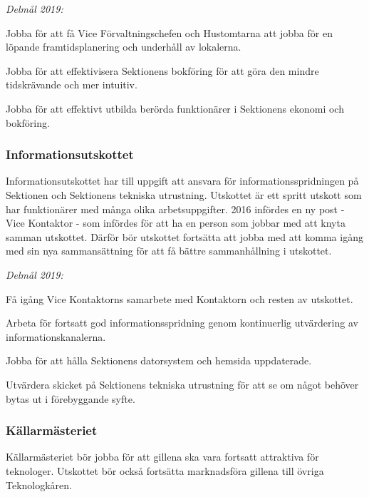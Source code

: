 \documentclass[10pt]{article}
\begin{document}
    \emph{Delmål 2019:}
    \begin{dashlist}
        \item Jobba för att få Vice Förvaltningschefen och Hustomtarna att jobba för en löpande framtidsplanering och underhåll av lokalerna. 
        \item Jobba för att effektivisera Sektionens bokföring för att göra den mindre tidskrävande och mer intuitiv. 
        \item Jobba för att effektivt utbilda berörda funktionärer i Sektionens ekonomi och bokföring.
    \end{dashlist}
    
    \newpage
    
    \subsubsection*{Informationsutskottet}
    Informationsutskottet har till uppgift att ansvara för informationsspridningen på Sektionen och Sektionens tekniska utrustning. Utskottet är ett spritt utskott som har funktionärer med många olika arbetsuppgifter. 2016 infördes en ny post - Vice Kontaktor - som infördes för att ha en person som jobbar med att knyta samman utskottet. Därför bör utskottet fortsätta att jobba med att komma igång med sin nya sammansättning för att få bättre sammanhållning i utskottet.
    
    \emph{Delmål 2019:}
    \begin{dashlist}
        \item Få igång Vice Kontaktorns samarbete med Kontaktorn och resten av utskottet.
        \item Arbeta för fortsatt god informationsspridning genom kontinuerlig utvärdering av informationskanalerna.
        \item Jobba för att hålla Sektionens datorsystem och hemsida uppdaterade.
        \item Utvärdera skicket på Sektionens tekniska utrustning för att se om något behöver bytas ut i förebyggande syfte.
    \end{dashlist}
    
    \subsubsection*{Källarmästeriet}
    Källarmästeriet bör jobba för att gillena ska vara fortsatt attraktiva för teknologer. Utskottet bör också fortsätta marknadsföra gillena till övriga Teknologkåren. 
    
\end{document}
